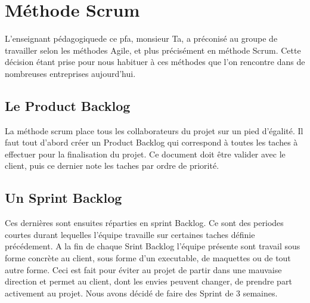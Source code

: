 \section{Méthode Scrum}
L'enseignant pédagogiquede ce pfa, monsieur Ta, a préconisé au groupe de travailler selon les méthodes Agile, et plus précisément en méthode Scrum.
Cette décision étant prise pour nous habituer à ces méthodes que l'on rencontre dans de nombreuses entreprises aujourd'hui.

\subsection*{Le Product Backlog}
La méthode scrum place tous les collaborateurs du projet sur un pied d'égalité. Il faut tout d'abord créer un Product Backlog qui correspond à toutes les taches à effectuer pour la finalisation du projet.
Ce document doit être valider avec le client, puis ce dernier note les taches par ordre de priorité.
\subsection*{Un Sprint Backlog}
Ces dernières sont ensuites réparties en sprint Backlog. Ce sont des periodes courtes durant lequelles l'équipe travaille sur certaines taches définie précédement. 
A la fin de chaque Srint Backlog l'équipe présente sont travail sous forme concrète au client, sous forme d'un executable, de maquettes ou de tout autre forme.
Ceci est fait pour éviter au projet de partir dans une mauvaise direction et permet au client, dont les envies peuvent changer, de prendre part activement au projet.
Nous avons décidé de faire des Sprint de 3 semaines.

\subsection*{}


